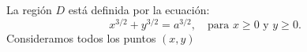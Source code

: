 La región \( D \) está definida por la ecuación:
\[
x^{3/2} + y^{3/2} = a^{3/2}, \quad \text{para } x \geq 0 \text{ y } y \geq 0.
\]
Consideramos todos los puntos \( (x, y) \)

